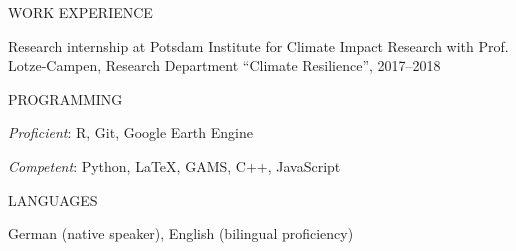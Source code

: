 \documentclass{article}
\begin{document}

\begin{minipage}[t]{0.12\textwidth}
    {\selectfont WORK EXPERIENCE} \\
\end{minipage}
\hspace{5mm}
\begin{minipage}[t]{0.8\textwidth}
    Research internship at Potsdam Institute for Climate Impact Research with Prof. Lotze-Campen, Research Department ``Climate Resilience'', 2017--2018
\end{minipage}
\medskip


\begin{minipage}[t]{0.12\textwidth}
    {\selectfont PROGRAMMING} \\
\end{minipage}
\hspace{5mm}
\begin{minipage}[t]{0.8\textwidth}
    \textit{Proficient}: R, Git, Google Earth Engine \par
    \textit{Competent}: Python, LaTeX, GAMS, C++, JavaScript
\end{minipage}
\medskip


\begin{minipage}[t]{0.12\textwidth}
    {\selectfont LANGUAGES} \\
\end{minipage}
\hspace{5mm}
\begin{minipage}[t]{0.8\textwidth}
    German (native speaker), English (bilingual proficiency)
\end{minipage}
\medskip

\end{document}
